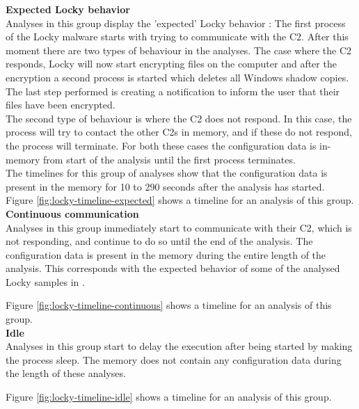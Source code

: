\documentclass[conference]{IEEEtran}
\begin{document}
\textbf{Expected Locky behavior}
\\Analyses in this group display the 'expected' Locky behavior \cite{nelson-locky}: The first process of the Locky malware starts with trying to communicate with the C2. After this moment there are two types of behaviour in the analyses. The case where the C2 responds, Locky will now start encrypting files on the computer and after the encryption a second process is started which deletes all Windows shadow copies. The last step performed is creating a notification to inform the user that their files have been encrypted.\\

The second type of behaviour is where the C2 does not respond. In this case, the process will try to contact the other C2s in memory, and if these do not respond, the process will terminate. For both these cases the configuration data is in-memory from start of the analysis until the first process terminates.\\

The timelines for this group of analyses show that the configuration data is present in the memory for 10 to 290 seconds after the analysis has started.\\

Figure \ref{fig:locky-timeline-expected} shows a timeline for an analysis of this group.\\

\textbf{Continuous communication }\\
Analyses in this group immediately start to communicate with their C2, which is not responding, and continue to do so until the end of the analysis. The configuration data is present in the memory during the entire length of the analysis. This corresponds with the expected behavior of some of the analysed Locky samples in \cite{nelson-locky}.

Figure \ref{fig:locky-timeline-continuous} shows a timeline for an analysis of this group.\\
 
\textbf{Idle}\\
Analyses in this group start to delay the execution after being started by making the process sleep. The memory does not contain any configuration data during the length of these analyses.

Figure \ref{fig:locky-timeline-idle} shows a timeline for an analysis of this group.\\
\end{document}
